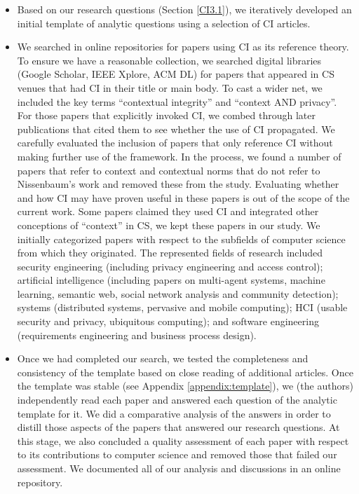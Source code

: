 \documentclass[../thesis.tex]{subfiles}
\newcommand\liststyleWWNumi{%
\renewcommand\labelitemi{${\bullet}$}
\renewcommand\labelitemii{${\circ}$}
\renewcommand\labelitemiii{${\blacksquare}$}
\renewcommand\labelitemiv{${\bullet}$}
}
\begin{document}
\liststyleWWNumi
\begin{itemize}
\item Based on our research questions (Section \ref{CI3.1}), we iteratively
developed an initial template of analytic questions using a selection
of CI articles. 
\item We searched in online repositories for papers using CI as its
reference theory. To ensure we have a reasonable collection, we
searched digital libraries (Google Scholar, IEEE Xplore, ACM DL) for
papers that appeared in CS venues that had CI in their title or main
body. To cast a wider net, we included the key terms
``contextual integrity'' and
``context AND privacy''. For those
papers that explicitly invoked CI, we combed through later publications
that cited them to see whether the use of CI propagated. We carefully
evaluated the inclusion of papers that only reference CI without making
further use of the framework. In the process, we found a number of
papers that refer to context and contextual norms that do not refer to
Nissenbaum's work and removed these from the study.
Evaluating whether and how CI may have proven useful in these papers is
out of the scope of the current work. Some papers claimed they used CI
and integrated other conceptions of
``context'' in CS, we kept these
papers in our study. We initially categorized papers with respect to
the subfields of computer science from which they originated. The
represented fields of research included security engineering (including
privacy engineering and access control); artificial intelligence
(including papers on multi-agent systems, machine learning, semantic
web, social network analysis and community detection); systems
(distributed systems, pervasive and mobile computing); HCI (usable
security and privacy, ubiquitous computing); and software engineering
(requirements engineering and business process design). 
\item Once we had completed our search, we tested the completeness and
consistency of the template based on close reading of additional
articles. Once the template was stable (see Appendix \ref{appendix:template}), we (the
authors) independently read each paper and answered each question of
the analytic template for it. We did a comparative analysis of the
answers in order to distill those aspects of the papers that answered
our research questions. At this stage, we also concluded a quality
assessment of each paper with respect to its contributions to computer
science and removed those that failed our assessment. We documented all
of our analysis and discussions in an online repository.

\end{itemize}
\end{document}
